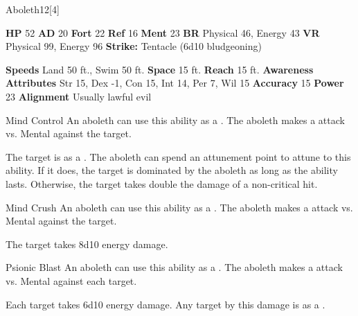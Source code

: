 \begin{monsection}{Aboleth}{12}[4]
    \begin{spellcontent}
      \begin{spelltargetinginfo}
        \pari \textbf{HP} 52 \monsep
          \textbf{AD} 20 \monsep
          \textbf{Fort} 22 \monsep
          \textbf{Ref} 16 \monsep
          \textbf{Ment} 23
        \pari \textbf{BR} Physical 46, Energy 43 \monsep
        \textbf{VR} Physical 99, Energy 96
        \pari \textbf{Strike:}
            Tentacle  (6d10 bludgeoning)
      \end{spelltargetinginfo}
    \end{spellcontent}
    \begin{monsterfooter}
      \pari \textbf{Speeds} Land 50 ft., Swim 50 ft. \monsep
        \textbf{Space} 15 ft. \monsep
        \textbf{Reach} 15 ft.
      \pari \textbf{Awareness} 
      \pari \textbf{Attributes}
        Str 15, Dex -1,
        Con 15, Int 14,
        Per 7, Wil 15
      \pari \textbf{Accuracy} 15 \monsep
        \textbf{Power} 23
      \pari \textbf{Alignment} Usually lawful evil
    \end{monsterfooter}
  \end{monsection}
  \begin{freeability}{Mind Control}
      An aboleth can use this ability as a . The aboleth makes a  attack
        vs. Mental against the target.
    
    \hit The target is  as a .
    \crit 
        The aboleth can spend an attunement point to attune to this ability.
        If it does, the target is dominated by the aboleth as long as the ability lasts.
        Otherwise, the target takes double the damage of a non-critical hit.
    \end{freeability}
  

    \begin{freeability}{Mind Crush}
      An aboleth can use this ability as a . The aboleth makes a  attack
        vs. Mental against the target.
    
    \hit The target takes 8d10 energy damage.
    \end{freeability}
  

    \begin{freeability}{Psionic Blast}
      An aboleth can use this ability as a . The aboleth makes a  attack
        vs. Mental against each target.
    
    \hit Each target takes 6d10 energy damage. Any target  by this damage is  as a .
    \end{freeability}
  
